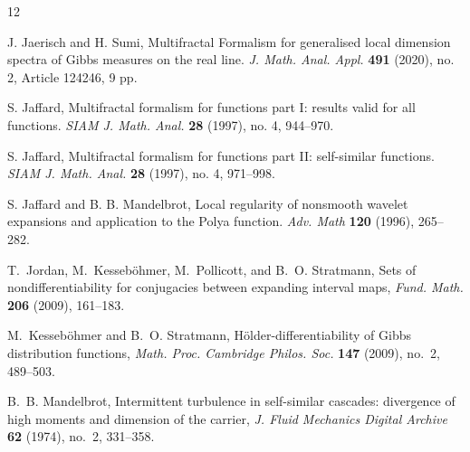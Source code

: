 \documentclass[11pt]{amsart}
\newcommand{\1}{1}
\begin{document}
\begin{thebibliography}{12}


{J. Jaerisch} and {H. Sumi}, Multifractal Formalism for generalised local dimension spectra of Gibbs measures on the real line. {\em J. Math. Anal. Appl.} {\bf 491} (2020), no. 2, Article 124246, 9 pp.

{S. Jaffard}, Multifractal formalism for functions part I: results valid for all functions. {\em SIAM J. Math. Anal.} {\bf 28} (1997), no. 4, 944--970.

{S. Jaffard}, Multifractal formalism for functions part II: self-similar functions.  {\em SIAM J. Math. Anal.} {\bf 28} (1997), no. 4, 971--998.

{S. Jaffard} and {B. B. Mandelbrot}, Local regularity of nonsmooth wavelet expansions and application to the Polya function. {\em Adv. Math} {\bf 120} (1996), 265--282.

T.~Jordan, M.~Kesseb{\"o}hmer, M.~Pollicott, and B.~O. Stratmann, Sets of nondifferentiability for conjugacies between expanding interval maps, {\em Fund.  Math.} \textbf{206} (2009), 161--183. %


M.~Kesseb{{\"o}}hmer and B.~O. Stratmann, H{\"o}lder-differentiability of 
{G}ibbs distribution functions, {\em Math. Proc. Cambridge Philos. Soc.}
  \textbf{147} (2009), no.~2, 489--503. %


B.~B. Mandelbrot, Intermittent turbulence in self-similar cascades:
  divergence of high moments and dimension of the carrier, {\em J. Fluid Mechanics Digital Archive} \textbf{62} (1974), no.~2, 331--358.


\end{thebibliography}
\end{document}

